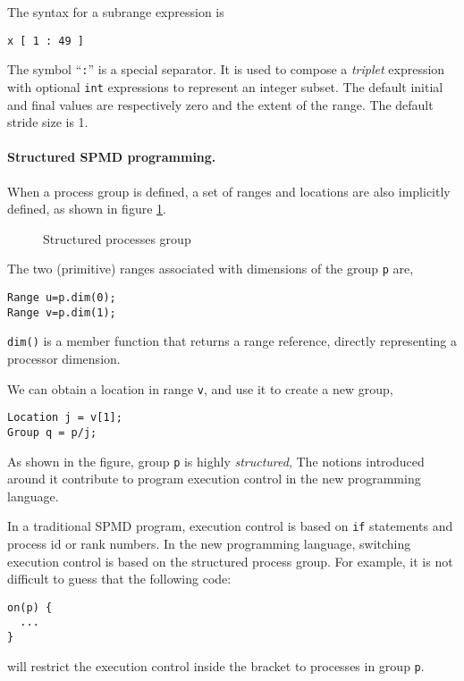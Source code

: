 The syntax for a subrange expression is
\small
\begin{verbatim}
x [ 1 : 49 ]
\end{verbatim}
\normalsize
The symbol ``\texttt{:}'' is a special separator. It is used to compose
a \emph{triplet} expression with optional \texttt{int} expressions to
represent an integer subset. The default initial and final values are
respectively zero and the extent of the range.  The default stride size
is 1.

\paragraph{Structured SPMD programming.}
\label{SPMD}

When a process group is defined, a set of ranges and
locations are also implicitly defined, as shown in figure \ref{fig:group}.
\begin{figure}[htbp]
  \begin{center}
    \leavevmode
    \caption{Structured processes group}
    \label{fig:group}
  \end{center}
\end{figure}
The two (primitive) ranges associated with dimensions of the group
\texttt{p} are,
\small
\begin{verbatim}
Range u=p.dim(0);  
Range v=p.dim(1);
\end{verbatim}
\normalsize
\texttt{dim()} is a member function that returns a range reference,
directly representing a processor dimension.

We can obtain a location in range \texttt{v}, and use it
to create a new group,
\small
\begin{verbatim}
Location j = v[1];
Group q = p/j;
\end{verbatim}
\normalsize
As shown in the figure, group \texttt{p} is highly \emph{structured},
The notions introduced around it contribute to program execution
control in the new programming language.

In a traditional SPMD program, execution control is based on
\texttt{if} statements and process id or rank numbers. In the new
programming language, switching execution control is based on the
structured process group.  For example, it is not difficult to guess
that the following code:
\small
\begin{verbatim}
on(p) {
  ...
}
\end{verbatim}
\normalsize
will restrict the execution control inside the bracket to processes in
group \texttt{p}.

